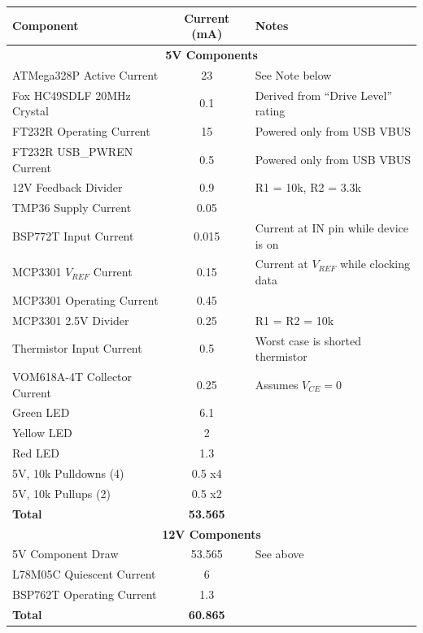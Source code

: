 \documentclass{article}
\begin{document}
\begin{center}
    \begin{tabular}{|l|c|l|}
        \hline
        Component & Current (mA) & Notes \\
        \hline
        \multicolumn{3}{|c|}{\textbf{5V Components}} \\
        \hline
        ATMega328P Active Current & 23 & See Note below \\
        Fox HC49SDLF 20MHz Crystal & 0.1 & Derived from ``Drive Level'' rating \\
        FT232R Operating Current & 15 & Powered only from USB VBUS \\
        FT232R USB\_PWREN Current & 0.5 & Powered only from USB VBUS \\
        12V Feedback Divider & 0.9 & R1 = 10k\textOmega{}, R2 = 3.3k\textOmega{} \\
        TMP36 Supply Current & 0.05 & \\
        BSP772T Input Current & 0.015 & Current at IN pin while device is on \\
        MCP3301 $V_{REF}$ Current &  0.15 & Current at $V_{REF}$ while clocking data \\
        MCP3301 Operating Current & 0.45 & \\
        MCP3301 2.5V Divider & 0.25 & R1 = R2 = 10k\textOmega{} \\
        Thermistor Input Current & 0.5 & Worst case is shorted thermistor \\
        VOM618A-4T Collector Current & 0.25 & Assumes $V_{CE} = 0$ \\
        Green LED & 6.1 & \\
        Yellow LED & 2 & \\
        Red LED & 1.3  & \\
        5V, 10k\textOmega{} Pulldowns (4) & 0.5 x4 & \\
        5V, 10k\textOmega{} Pullups (2) & 0.5 x2 & \\
        \textbf{Total} & \textbf{53.565} & \\ 

        \hline
        \hline

        \multicolumn{3}{|c|}{\textbf{12V Components}} \\
        \hline
        5V Component Draw & 53.565 & See above \\
        L78M05C Quiescent Current & 6 & \\
        BSP762T Operating Current & 1.3 & \\
        \textbf{Total} & \textbf{60.865} & \\
        \hline
    \end{tabular}
\end{center}
\end{document}
